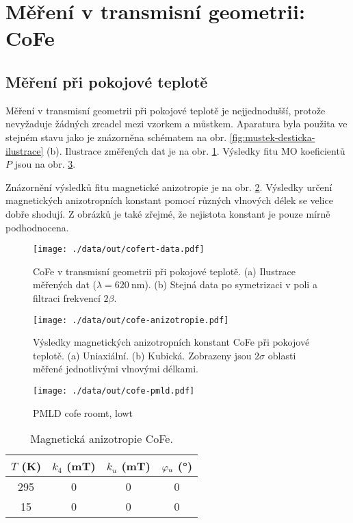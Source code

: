 \section{Měření v transmisní geometrii: CoFe}
\label{chap:vysledky-cofe}

\subsection{Měření při pokojové teplotě}
\label{chap:vysledky-cofe-roomt}

Měření v transmisní geometrii při pokojové teplotě je nejjednodušší, protože nevyžaduje žádných zrcadel mezi vzorkem a můstkem.
Aparatura byla použita ve stejném stavu jako je znázorněna schématem na obr. \ref{fig:mustek-desticka-ilustrace} (b).
Ilustrace změřených dat je na obr. \ref{fig:vysledky-cofe-schema-data}.
Výsledky fitu MO koeficientů $P$ jsou na obr. \ref{fig:vysledky-cofe-PMLD}.

Znázornění výsledků fitu magnetické anizotropie je na obr. \ref{fig:vysledky-cofe-roomt-anizotropie}.
Výsledky určení magnetických anizotropních konstant pomocí různých vlnových délek se velice dobře shodují. 
Z obrázků je také zřejmé, že nejistota konstant je pouze mírně podhodnocena.

\begin{figure}[htbp]
    \centering
    \texttt{[image: ./data/out/cofert-data.pdf]}
    \caption{CoFe v transmisní geometrii při pokojové teplotě. (a) Ilustrace měřených dat ($\lambda=\SI{620}{\nano\meter}$). (b) Stejná data po symetrizaci v poli a filtraci frekvencí $2\beta$.}
    \label{fig:vysledky-cofe-schema-data}
\end{figure}

\begin{figure}[htbp]
    \centering
    \texttt{[image: ./data/out/cofe-anizotropie.pdf]}
    \caption{Výsledky magnetických anizotropních konstant CoFe při pokojové teplotě. (a) Uniaxiální. (b) Kubická. Zobrazeny jsou $2\sigma$ oblasti měřené jednotlivými vlnovými délkami.}
    \label{fig:vysledky-cofe-roomt-anizotropie}
\end{figure}

\begin{figure}[htbp]
    \centering
    \texttt{[image: ./data/out/cofe-pmld.pdf]}
    \caption{PMLD cofe roomt, lowt}
    \label{fig:vysledky-cofe-PMLD}
\end{figure}


\begin{table}[tp]
    \caption{Magnetická anizotropie CoFe.}
    \label{tab:cofe-anizotropie}
    \centering
    \begin{tabular}{cccc}
        \toprule
        $T$ (\si{\kelvin}) & $k_4$ (\si{\milli\tesla}) & $k_u$ (\si{\milli\tesla}) & $\varphi_u$ (\si{\degree}) \\ \midrule[\heavyrulewidth]
        295 & 0 & 0 & 0 \\
        15 & 0 & 0 & 0 \\
        \bottomrule 
    \end{tabular} 
\end{table}

